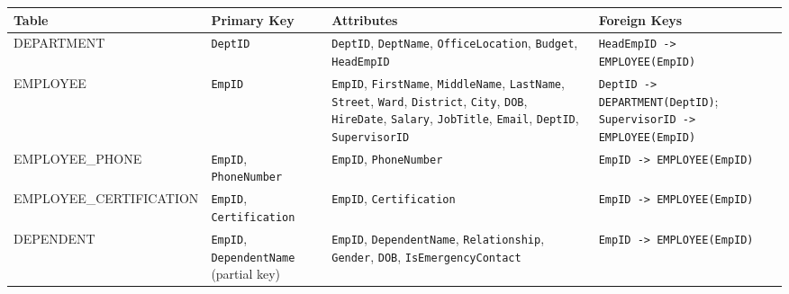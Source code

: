 \documentclass[a4paper,12pt]{report}
\newcounter{none} %
\begin{document}
{\def\LTcaptype{none} %
\begin{longtable}[]{@{}
  >{\raggedright\arraybackslash}p{}
  >{\raggedright\arraybackslash}p{}
  >{\raggedright\arraybackslash}p{}
  >{\raggedright\arraybackslash}p{}@{}}
\toprule\noalign{}
\begin{minipage}[b]{\linewidth}\raggedright
Table
\end{minipage} & \begin{minipage}[b]{\linewidth}\raggedright
Primary Key
\end{minipage} & \begin{minipage}[b]{\linewidth}\raggedright
Attributes
\end{minipage} & \begin{minipage}[b]{\linewidth}\raggedright
Foreign Keys
\end{minipage} \\
\midrule\noalign{}
\endhead
\bottomrule\noalign{}
\endlastfoot
DEPARTMENT & \texttt{DeptID} & \texttt{DeptID}, \texttt{DeptName}, \texttt{OfficeLocation}, \texttt{Budget}, \texttt{HeadEmpID} & \texttt{HeadEmpID -\textgreater{} EMPLOYEE(\allowbreak{}\allowbreak{}EmpID)} \\
EMPLOYEE & \texttt{EmpID} & \texttt{EmpID}, \texttt{FirstName}, \texttt{MiddleName}, \texttt{LastName}, \texttt{Street}, \texttt{Ward}, \texttt{District}, \texttt{City}, \texttt{DOB}, \texttt{HireDate}, \texttt{Salary}, \texttt{JobTitle}, \texttt{Email}, \texttt{DeptID}, \texttt{SupervisorID} & \texttt{DeptID -\textgreater{} DEPARTMENT(\allowbreak{}\allowbreak{}DeptID)}; \texttt{SupervisorID -\textgreater{} EMPLOYEE(\allowbreak{}\allowbreak{}EmpID)} \\
EMPLOYEE\_\allowbreak{}PHONE & \texttt{EmpID}, \texttt{PhoneNumber} & \texttt{EmpID}, \texttt{PhoneNumber} & \texttt{EmpID -\textgreater{} EMPLOYEE(\allowbreak{}\allowbreak{}EmpID)} \\
EMPLOYEE\_\allowbreak{}CERTIFICATION & \texttt{EmpID}, \texttt{Certification} & \texttt{EmpID}, \texttt{Certification} & \texttt{EmpID -\textgreater{} EMPLOYEE(\allowbreak{}\allowbreak{}EmpID)} \\
DEPENDENT & \texttt{EmpID}, \texttt{DependentName} (\allowbreak{}partial key) & \texttt{EmpID}, \texttt{DependentName}, \texttt{Relationship}, \texttt{Gender}, \texttt{DOB}, \texttt{IsEmergencyContact} & \texttt{EmpID -\textgreater{} EMPLOYEE(\allowbreak{}\allowbreak{}EmpID)} \\
\end{longtable}
}
\end{document}
